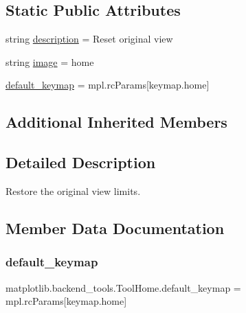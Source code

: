 \subsection*{Static Public Attributes}
\begin{DoxyCompactItemize}
\item 
string \hyperlink{classmatplotlib_1_1backend__tools_1_1ToolHome_a1e3d3a25c6111721a90fb861fa2b7d56}{description} = \textquotesingle{}Reset original view\textquotesingle{}
\item 
string \hyperlink{classmatplotlib_1_1backend__tools_1_1ToolHome_abc9bb69b5a177f46972360f8ee41e986}{image} = \textquotesingle{}home\textquotesingle{}
\item 
\hyperlink{classmatplotlib_1_1backend__tools_1_1ToolHome_a7e1bf43db07c25a9781e749106dcb566}{default\+\_\+keymap} = mpl.\+rc\+Params\mbox{[}\textquotesingle{}keymap.\+home\textquotesingle{}\mbox{]}
\end{DoxyCompactItemize}
\subsection*{Additional Inherited Members}


\subsection{Detailed Description}
\begin{DoxyVerb}Restore the original view limits.\end{DoxyVerb}
 

\subsection{Member Data Documentation}
\mbox{\label{classmatplotlib_1_1backend__tools_1_1ToolHome_a7e1bf43db07c25a9781e749106dcb566}} 
\subsubsection{\texorpdfstring{default\+\_\+keymap}{default\_keymap}}
{\footnotesize\ttfamily matplotlib.\+backend\+\_\+tools.\+Tool\+Home.\+default\+\_\+keymap = mpl.\+rc\+Params\mbox{[}\textquotesingle{}keymap.\+home\textquotesingle{}\mbox{]}\hspace{0.3cm}{\ttfamily [static]}}

